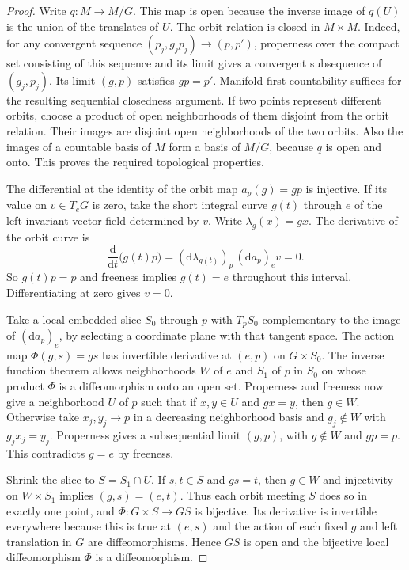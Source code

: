 \documentclass[11pt,oneside,openany]{book}
\theoremstyle{definition}
\theoremstyle{remark}
\newcommand{\dd}{\mathrm d}
\begin{document}
\begin{proof}
Write \(q:M\to M/G\). This map is open because the inverse image of \(q(U)\) is the union of the translates of \(U\). The orbit relation is closed in \(M\times M\). Indeed, for any convergent sequence \((p_j,g_jp_j)\to (p,p')\), properness over the compact set consisting of this sequence and its limit gives a convergent subsequence of \((g_j,p_j)\). Its limit \((g,p)\) satisfies \(gp=p'\). Manifold first countability suffices for the resulting sequential closedness argument. If two points represent different orbits, choose a product of open neighborhoods of them disjoint from the orbit relation. Their images are disjoint open neighborhoods of the two orbits. Also the images of a countable basis of \(M\) form a basis of \(M/G\), because \(q\) is open and onto. This proves the required topological properties.

The differential at the identity of the orbit map \(a_p(g)=gp\) is injective. If its value on \(v\in T_eG\) is zero, take the short integral curve \(g(t)\) through \(e\) of the left-invariant vector field determined by \(v\). Write \(\lambda_g(x)=gx\). The derivative of the orbit curve is
\[
 \frac{\dd}{\dd t}\big(g(t)p\big)
 =(\dd\lambda_{g(t)})_p\,(\dd a_p)_e v=0.
\]
So \(g(t)p=p\) and freeness implies \(g(t)=e\) throughout this interval. Differentiating at zero gives \(v=0\).

Take a local embedded slice \(S_0\) through \(p\) with \(T_pS_0\) complementary to the image of \((\dd a_p)_e\), by selecting a coordinate plane with that tangent space. The action map \(\Phi(g,s)=gs\) has invertible derivative at \((e,p)\) on \(G\times S_0\). The inverse function theorem allows neighborhoods \(W\) of \(e\) and \(S_1\) of \(p\) in \(S_0\) on whose product \(\Phi\) is a diffeomorphism onto an open set. Properness and freeness now give a neighborhood \(U\) of \(p\) such that if \(x,y\in U\) and \(gx=y\), then \(g\in W\). Otherwise take \(x_j,y_j\to p\) in a decreasing neighborhood basis and \(g_j\notin W\) with \(g_jx_j=y_j\). Properness gives a subsequential limit \((g,p)\), with \(g\notin W\) and \(gp=p\). This contradicts \(g=e\) by freeness.

Shrink the slice to \(S=S_1\cap U\). If \(s,t\in S\) and \(gs=t\), then \(g\in W\) and injectivity on \(W\times S_1\) implies \((g,s)=(e,t)\). Thus each orbit meeting \(S\) does so in exactly one point, and \(\Phi:G\times S\to GS\) is bijective. Its derivative is invertible everywhere because this is true at \((e,s)\) and the action of each fixed \(g\) and left translation in \(G\) are diffeomorphisms. Hence \(GS\) is open and the bijective local diffeomorphism \(\Phi\) is a diffeomorphism.


\end{proof}
\end{document}

